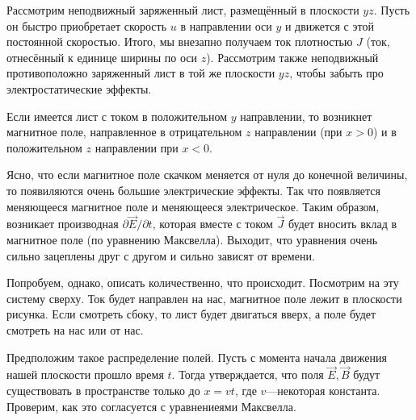 \documentclass[12pt,a4paper]{article}
\numberwithin{equation}{section}
\numberwithin{equation}{section}
\newcommand{\pt}{\partial}
\begin{document}
Рассмотрим неподвижный заряженный лист, размещённый в плоскости
$yz$. Пусть он быстро приобретает скорость $u$ в направлении оси $y$ и
движется с этой постоянной скоростью. Итого, мы внезапно получаем ток
плотностью $J$ (ток, отнесённый к единице ширины по оси
$z$). Рассмотрим также неподвижный противоположно заряженный лист в
той же плоскости $yz$, чтобы забыть про электростатические эффекты.

Если имеется лист с током в положительном $y$ направлении, то
возникнет магнитное поле, направленное в отрицательном $z$
направлении (при $x>0$) и в положительном $z$ направлении при $x<0$. 

Ясно, что если магнитное поле скачком меняется от нуля до конечной
величины, то появиляются очень большие электрические эффекты. Так что
появляется меняющееся магнитное поле и меняющееся электрическое. Таким
образом, возникает производная $\pt \vec{E} / \pt t$, которая вместе с
током $\vec{J}$ будет вносить вклад в магнитное поле (по уравнению
Максвелла). Выходит, что уравнения очень сильно зацеплены друг с
другом и сильно зависят от времени. 

Попробуем, однако, описать количественно, что происходит. Посмотрим на
эту систему сверху. Ток будет направлен на нас, магнитное поле лежит
в плоскости рисунка. Если смотреть сбоку, то лист будет двигаться
вверх, а поле будет смотреть на нас или от нас. 

Предположим такое распределение полей. Пусть с момента начала движения
нашей плоскости прошло время $t$. Тогда утверждается, что поля
$\vec{E}, \vec{B}$ будут существовать в пространстве только до
$x=vt$, где $v$---некоторая константа. Проверим, как это согласуется с
уравнениеями Максвелла. 
\end{document}
